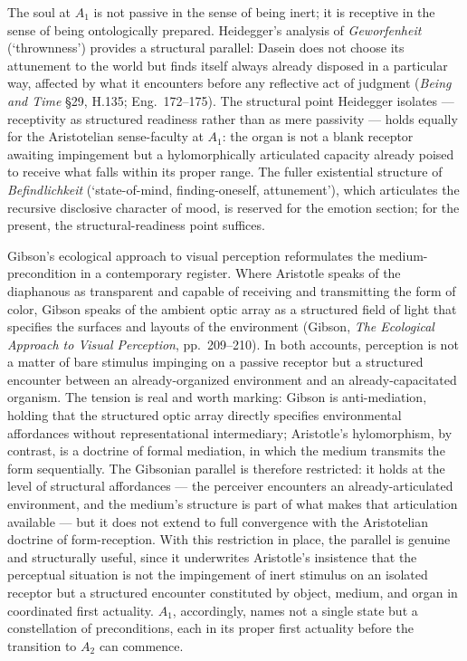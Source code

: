 The soul at $A_1$ is not passive in the sense of being inert; it is receptive in the sense of being ontologically prepared. Heidegger's analysis of \textit{Geworfenheit} (`thrownness') provides a structural parallel: Dasein does not choose its attunement to the world but finds itself always already disposed in a particular way, affected by what it encounters before any reflective act of judgment (\textit{Being and Time} \S 29, H.135; Eng.~172--175). The structural point Heidegger isolates --- receptivity as structured readiness rather than as mere passivity --- holds equally for the Aristotelian sense-faculty at $A_1$: the organ is not a blank receptor awaiting impingement but a hylomorphically articulated capacity already poised to receive what falls within its proper range. The fuller existential structure of \textit{Befindlichkeit} (`state-of-mind, finding-oneself, attunement'), which articulates the recursive disclosive character of mood, is reserved for the emotion section; for the present, the structural-readiness point suffices.

Gibson's ecological approach to visual perception reformulates the medium-precondition in a contemporary register. Where Aristotle speaks of the diaphanous as transparent and capable of receiving and transmitting the form of color, Gibson speaks of the ambient optic array as a structured field of light that specifies the surfaces and layouts of the environment (Gibson, \textit{The Ecological Approach to Visual Perception}, pp.~209--210). In both accounts, perception is not a matter of bare stimulus impinging on a passive receptor but a structured encounter between an already-organized environment and an already-capacitated organism. The tension is real and worth marking: Gibson is anti-mediation, holding that the structured optic array directly specifies environmental affordances without representational intermediary; Aristotle's hylomorphism, by contrast, is a doctrine of formal mediation, in which the medium transmits the form sequentially. The Gibsonian parallel is therefore restricted: it holds at the level of structural affordances --- the perceiver encounters an already-articulated environment, and the medium's structure is part of what makes that articulation available --- but it does not extend to full convergence with the Aristotelian doctrine of form-reception. With this restriction in place, the parallel is genuine and structurally useful, since it underwrites Aristotle's insistence that the perceptual situation is not the impingement of inert stimulus on an isolated receptor but a structured encounter constituted by object, medium, and organ in coordinated first actuality. $A_1$, accordingly, names not a single state but a constellation of preconditions, each in its proper first actuality before the transition to $A_2$ can commence.

